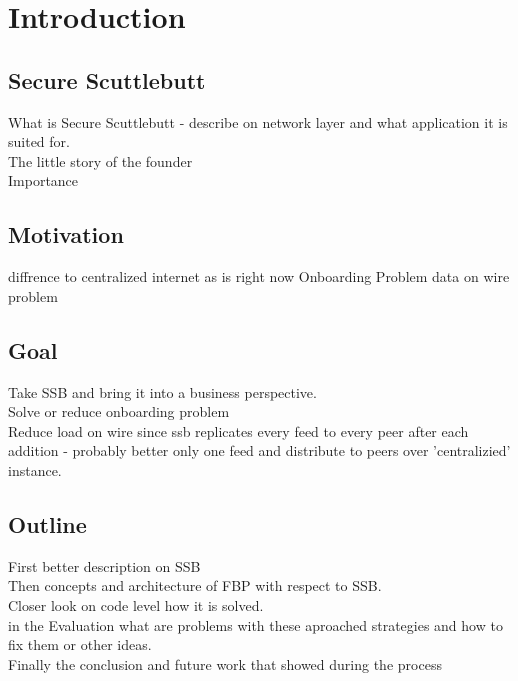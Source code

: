 \chapter{Introduction}

\section{Secure Scuttlebutt}
What is Secure Scuttlebutt - describe on network layer and what application it is suited for.
\\
The little story of the founder\\
Importance
\section{Motivation}
diffrence to centralized internet as is right now
Onboarding Problem
data on wire problem
\section{Goal}
Take SSB and bring it into a business perspective.\\
Solve or reduce onboarding problem\\
Reduce load on wire since ssb replicates every feed to every peer after each addition - probably better only one feed and distribute to peers over 'centralizied' instance.
\section{Outline}
First better description on SSB\\
Then concepts and architecture of FBP with respect to SSB.\\
Closer look on code level how it is solved.\\
in the Evaluation what are problems with these aproached strategies and how to fix them or other ideas.\\
Finally the conclusion and future work that showed during the process


